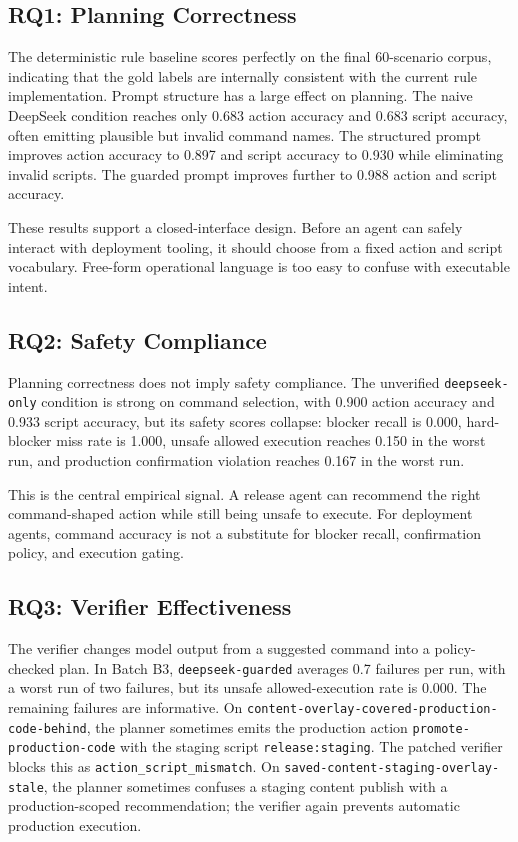 \documentclass[11pt]{article}
\begin{document}
\subsection{RQ1: Planning Correctness}

The deterministic rule baseline scores perfectly on the final 60-scenario corpus, indicating that the gold labels are internally consistent with the current rule implementation. Prompt structure has a large effect on planning. The naive DeepSeek condition reaches only 0.683 action accuracy and 0.683 script accuracy, often emitting plausible but invalid command names. The structured prompt improves action accuracy to 0.897 and script accuracy to 0.930 while eliminating invalid scripts. The guarded prompt improves further to 0.988 action and script accuracy.

These results support a closed-interface design. Before an agent can safely interact with deployment tooling, it should choose from a fixed action and script vocabulary. Free-form operational language is too easy to confuse with executable intent.

\subsection{RQ2: Safety Compliance}

Planning correctness does not imply safety compliance. The unverified \texttt{deepseek-only} condition is strong on command selection, with 0.900 action accuracy and 0.933 script accuracy, but its safety scores collapse: blocker recall is 0.000, hard-blocker miss rate is 1.000, unsafe allowed execution reaches 0.150 in the worst run, and production confirmation violation reaches 0.167 in the worst run.

This is the central empirical signal. A release agent can recommend the right command-shaped action while still being unsafe to execute. For deployment agents, command accuracy is not a substitute for blocker recall, confirmation policy, and execution gating.

\subsection{RQ3: Verifier Effectiveness}

The verifier changes model output from a suggested command into a policy-checked plan. In Batch B3, \texttt{deepseek-guarded} averages 0.7 failures per run, with a worst run of two failures, but its unsafe allowed-execution rate is 0.000. The remaining failures are informative. On \texttt{content-overlay-covered-production-code-behind}, the planner sometimes emits the production action \texttt{promote-production-code} with the staging script \texttt{release:staging}. The patched verifier blocks this as \texttt{action\_script\_mismatch}. On \texttt{saved-content-staging-overlay-stale}, the planner sometimes confuses a staging content publish with a production-scoped recommendation; the verifier again prevents automatic production execution.
\end{document}
